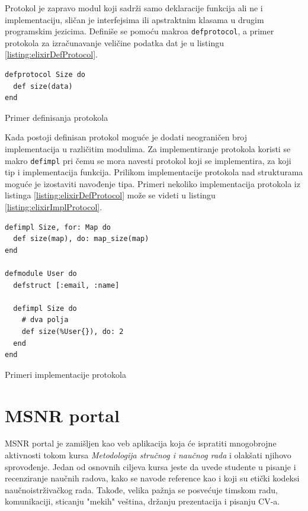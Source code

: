 \documentclass[12pt,oneside]{memoir}
\begin{document}
Protokol je zapravo modul koji sadrži samo deklaracije funkcija ali ne i implementaciju,
sličan je interfejsima ili apstraktnim klasama u drugim programskim jezicima. Definiše se
pomoću makroa \texttt{defprotocol}, a primer protokola za izračunavanje veličine podatka dat
je u listingu \ref{listing:elixirDefProtocol}.
\begin{listing}[!ht]
\begin{verbatim}
defprotocol Size do
  def size(data)
end
\end{verbatim}
\caption{Primer definisanja protokola}
\label{listing:elixirDefProtocol}
\end{listing}
Kada postoji definisan protokol moguće je dodati neograničen broj implementacija u
različitim modulima. Za implementiranje protokola koristi se makro \texttt{defimpl} pri čemu
se mora navesti protokol koji se implementira, za koji tip i implementacija funkcija.
Prilikom implementacije protokola nad strukturama moguće je izostaviti navođenje tipa.
Primeri nekoliko implementacija protokola iz listinga \ref{listing:elixirDefProtocol} može se videti u
listingu \ref{listing:elixirImplProtocol}.
\begin{listing}[!ht]
\begin{verbatim}
defimpl Size, for: Map do
  def size(map), do: map_size(map)
end

defmodule User do
  defstruct [:email, :name]

  defimpl Size do
    # dva polja
    def size(%User{}), do: 2
  end
end
\end{verbatim}
\caption{Primeri implementacije protokola}
\label{listing:elixirImplProtocol}
\end{listing}

\chapter{MSNR portal}
MSNR portal je zamišljen kao veb aplikacija koja će ispratiti mnogobrojne aktivnosti tokom kursa \emph{Metodologija stručnog i naučnog rada} i olakšati njihovo sprovođenje.
Jedan od osnovnih ciljeva kursa jeste da uvede studente u pisanje i recenziranje naučnih radova, kako se navode reference kao i koji su etički kodeksi naučnoistrživačkog rada.
Takođe, velika pažnja se posvećuje timskom radu, komunikaciji, sticanju "mekih" veština, držanju prezentacija i pisanju CV-a.
\end{document}

